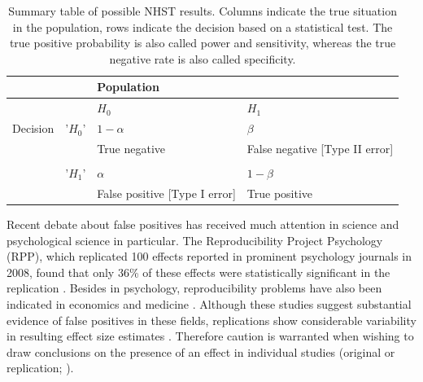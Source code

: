 \documentclass{article}
\begin{document}
\begin{table}[htbp]
\caption{Summary table of possible NHST results. Columns indicate the true situation in the population, rows indicate the decision based on a statistical test. The true positive probability is also called power and sensitivity, whereas the true negative rate is also called specificity.}
\begin{adjustbox}{width=\textwidth,totalheight=\textheight,keepaspectratio,angle=0}
\centering
\begin{tabular}{llll}
&    & Population                        &                                    \\ \hline
&    & $H_0$                                & $H_1$                                 \\
Decision & '$H_0$' & $1-\alpha$                           & $\beta$                               \\
&    & True negative                     & False negative {[}Type II error{]} \\
& & & \\
& '$H_1$' & $\alpha$                             & $1-\beta$                             \\
&    & False positive {[}Type I error{]} & True positive                   \\  \hline
\end{tabular}
\end{adjustbox}
\label{tab:tab1}
\end{table}

Recent debate about false positives has received much attention in science and psychological science in particular. The Reproducibility Project Psychology (RPP), which replicated 100 effects reported in prominent psychology journals in 2008, found that only 36\% of these effects were statistically significant in the replication \cite{Open_Science_Collaboration2015-zs}. Besides in psychology, reproducibility problems have also been indicated in economics \cite{Camerer2016-zz} and medicine \cite{Begley2012-uc}. Although these studies suggest substantial evidence of false positives in these fields, replications show considerable variability in resulting effect size estimates \cite{Klein2014-jb, Stanley2014-pd}. Therefore caution is warranted when wishing to draw conclusions on the presence of an effect in individual studies (original or replication; \cite{Open_Science_Collaboration2015-zs,Gilbert2016-mi,Anderson2016-bv}).
\end{document}
